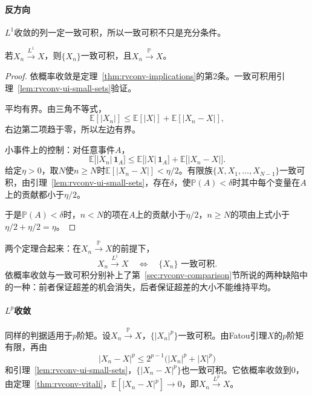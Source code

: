 \paragraph{反方向}
$L^{1}$收敛的列一定一致可积，所以一致可积不只是充分条件。

\begin{theorem}[$L^{1}$收敛蕴含一致可积]
\label{thm:rvconv-l1-ui}
若$X_n\xrightarrow{L^{1}}X$，则$\{X_n\}$一致可积，且$X_n\xrightarrow{\mathbb{P}}X$。
\end{theorem}

\begin{proof}
依概率收敛是定理~\ref{thm:rvconv-implications}的第2条。一致可积用引理~\ref{lem:rvconv-ui-small-sets}验证。

平均有界。由三角不等式，
\[
 \mathbb{E}[\lvert X_n\rvert]\leq\mathbb{E}[\lvert X\rvert]+\mathbb{E}[\lvert X_n-X\rvert] ,
\]
右边第二项趋于零，所以左边有界。

小事件上的控制：对任意事件$A$，
\[
 \mathbb{E}\bigl[\lvert X_n\rvert\,\mathbf{1}_{A}\bigr]\leq\mathbb{E}\bigl[\lvert X\rvert\,\mathbf{1}_{A}\bigr]+\mathbb{E}\bigl[\lvert X_n-X\rvert\bigr] .
\]
给定$\eta>0$，取$N$使$n\geq N$时$\mathbb{E}[\lvert X_n-X\rvert]<\eta/2$。有限族$\{X,X_1,\dots,X_{N-1}\}$一致可积，由引理~\ref{lem:rvconv-ui-small-sets}，存在$\delta$，使$\mathbb{P}(A)<\delta$时其中每个变量在$A$上的贡献都小于$\eta/2$。

于是$\mathbb{P}(A)<\delta$时，$n<N$的项在$A$上的贡献小于$\eta/2$，$n\geq N$的项由上式小于$\eta/2+\eta/2=\eta$。
\end{proof}

两个定理合起来：在$X_n\xrightarrow{\mathbb{P}}X$的前提下，
\begin{equation}
 X_n\xrightarrow{L^{1}}X\quad\Longleftrightarrow\quad\{X_n\}\text{ 一致可积} .
 \label{eq:rvconv-l1-iff}
\end{equation}
依概率收敛与一致可积分别补上了第~\ref{sec:rvconv-comparison}节所说的两种缺陷中的一种：前者保证超差的机会消失，后者保证超差的大小不能维持平均。

\paragraph{\texorpdfstring{$L^{p}$}{Lp}收敛}
同样的判据适用于$p$阶矩。设$X_n\xrightarrow{\mathbb{P}}X$，$\{\lvert X_n\rvert^{p}\}$一致可积。由Fatou引理$X$的$p$阶矩有限，再由
\[
 \lvert X_n-X\rvert^{p}\leq2^{p-1}\bigl(\lvert X_n\rvert^{p}+\lvert X\rvert^{p}\bigr)
\]
和引理~\ref{lem:rvconv-ui-small-sets}，$\{\lvert X_n-X\rvert^{p}\}$也一致可积。它依概率收敛到$0$，由定理~\ref{thm:rvconv-vitali}，$\mathbb{E}[\lvert X_n-X\rvert^{p}]\to0$，即$X_n\xrightarrow{L^{p}}X$。

